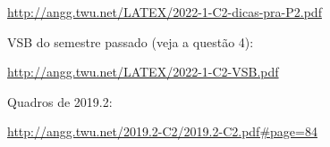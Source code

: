 \documentclass[oneside,12pt]{article}
\begin{document}
{{{\footnotesize

\url{http://angg.twu.net/LATEX/2022-1-C2-dicas-pra-P2.pdf}

}

\msk


VSB do semestre passado (veja a questão 4):

{\footnotesize

\url{http://angg.twu.net/LATEX/2022-1-C2-VSB.pdf}

}

\msk

Quadros de 2019.2:

\url{http://angg.twu.net/2019.2-C2/2019.2-C2.pdf\#page=84}


}\anothercol{
}}











\end{document}
